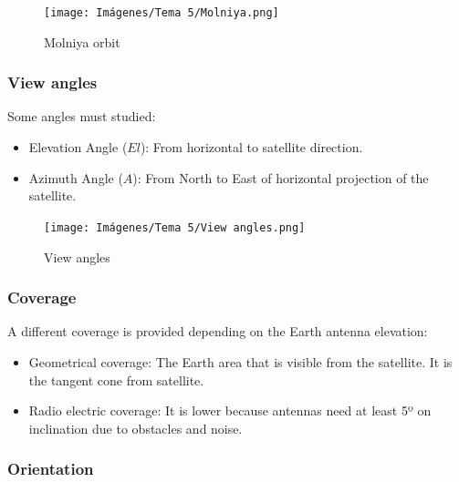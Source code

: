 \documentclass[
	12pt,
	twoside
]{book}
\begin{document}
\begin{figure}[H]
	\centering
	\texttt{[image: Imágenes/Tema 5/Molniya.png]}
	\caption{
		\label{fig:unit5_Molniya}
		Molniya orbit
	}
\end{figure}

\subsubsection{View angles}

Some angles must studied:
\begin{itemize}
	\item Elevation Angle ($El$): From horizontal to satellite direction.
	\item Azimuth Angle ($A$): From North to East of horizontal projection of the satellite.
\end{itemize}

\begin{figure}[H]
	\centering
	\texttt{[image: Imágenes/Tema 5/View angles.png]}
	\caption{
		\label{fig:unit5_view_angles}
		View angles
	}
\end{figure}

\subsubsection{Coverage}

A different coverage is provided depending on the Earth antenna elevation:
\begin{itemize}
	\item Geometrical coverage: The Earth area that is visible from the satellite. It is the tangent cone from satellite.
	\item Radio electric coverage: It is lower because antennas need at least 5º on inclination due to obstacles and noise.
\end{itemize}

\subsubsection{Orientation}
\end{document}
